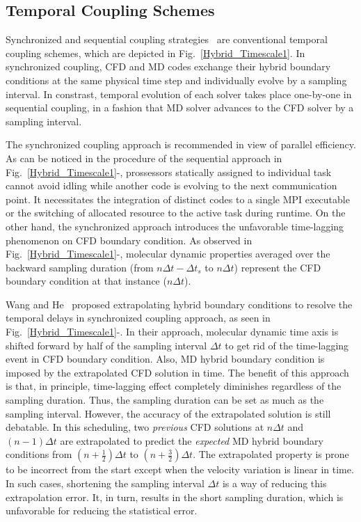 \documentclass[preprint,12pt]{elsarticle}
\begin{document}
\subsection{Temporal Coupling Schemes}
\label{sec:numerical_temporal}


Synchronized and sequential coupling strategies~\cite{Time_Mechanism} are
conventional temporal coupling schemes, which are depicted in
Fig.~\ref{Hybrid_Timescale1}. In synchronized coupling, CFD and MD codes
exchange their hybrid boundary conditions at the same physical time step
and individually evolve by a sampling interval. In constrast, temporal
evolution of each solver takes place one-by-one in sequential coupling,
in a fashion that MD solver advances to the CFD solver by a sampling interval.

The synchronized coupling approach is recommended in view of parallel efficiency.
As can be noticed in the procedure of the sequential approach in
Fig.~\ref{Hybrid_Timescale1}-,
prossessors statically assigned to individual task cannot avoid idling
while another code is evolving to the next communication point.
It necessitates the integration of distinct codes to a single MPI executable
or the switching of allocated resource to the active task during runtime.
On the other hand, the synchronized approach introduces the unfavorable
time-lagging phenomenon on CFD boundary condition. As observed in
Fig.~\ref{Hybrid_Timescale1}-, molecular dynamic
properties averaged over the backward sampling duration
(from $n{\Delta}t-{\Delta}t_{s}$ to $n{\Delta}t$) represent the CFD
boundary condition at that instance ($n{\Delta}t$).

Wang and He~\cite{Wang} proposed extrapolating hybrid boundary conditions
to resolve the temporal delays in synchronized coupling approach, as seen in
Fig.~\ref{Hybrid_Timescale1}-. In their approach,
molecular dynamic time axis is shifted forward by half of the sampling interval
${\Delta}t$ to get rid of the time-lagging event in CFD boundary condition.
Also, MD hybrid boundary condition is imposed by the extrapolated CFD solution
in time. The benefit of this approach is that, in principle,
time-lagging effect completely diminishes regardless of the sampling duration.
Thus, the sampling duration can be set as much as the sampling interval.
However, the accuracy of the extrapolated solution is still debatable.
In this scheduling, two \textit{previous} CFD solutions
at $n{\Delta}t$ and $(n-1){\Delta}t$ are extrapolated to predict the
\textit{expected} MD hybrid boundary conditions
from $(n+\frac{1}{2}){\Delta}t$ to $(n+\frac{3}{2}){\Delta}t$.
The extrapolated property is prone to be incorrect from the start
except when the velocity variation is linear in time. In such cases, shortening the sampling
interval ${\Delta}t$ is a way of reducing this extrapolation error. It, in turn, results in
the short sampling duration, which is unfavorable for reducing the statistical error.
\end{document}
